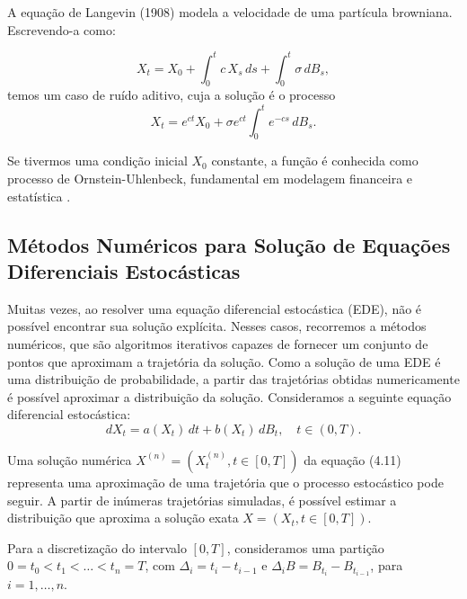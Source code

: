 \documentclass[12pt,openright,oneside,a4paper]{abntex2}
\numberwithin{equation}{section}
\begin{document}
A equação de Langevin (1908) modela a velocidade de uma partícula browniana. Escrevendo-a como:

\begin{equation}
X_t = X_0 + \int_0^t c\, X_s \, ds + \int_0^t \sigma \, dB_s,
\end{equation}
temos um caso de ruído aditivo, cuja a solução é o processo 
\begin{equation}
X_t = e^{ct} X_0 + \sigma e^{ct} \int_0^t e^{-cs}\, dB_s.
\end{equation}

Se tivermos uma condição inicial $X_0$ constante, a função é conhecida como  processo de Ornstein-Uhlenbeck, fundamental em modelagem financeira e estatística \parencite [p.~141] {Mikosh}.




\subsection{Métodos Numéricos para Solução de Equações Diferenciais Estocásticas}


Muitas vezes, ao resolver uma equação diferencial estocástica (EDE), não é possível encontrar sua solução explícita. 
Nesses casos, recorremos a métodos numéricos, que são algoritmos iterativos capazes de fornecer um conjunto de pontos 
que aproximam a trajetória da solução. Como a solução de uma EDE é uma distribuição de probabilidade, a partir das 
trajetórias obtidas numericamente é possível aproximar a distribuição da solução. Consideramos a seguinte equação diferencial estocástica:
\begin{equation}
    dX_t = a(X_t)\,dt + b(X_t)\,dB_t, \quad t \in (0,T).
\end{equation}

Uma solução numérica \(X^{(n)} = (X_t^{(n)}, t \in [0,T])\) da equação (4.11) representa uma aproximação de uma trajetória que o processo estocástico pode seguir. A partir de inúmeras trajetórias simuladas, é possível estimar a distribuição que aproxima a solução exata \(X = (X_t, t \in [0,T])\).

Para a discretização do intervalo \([0,T]\), consideramos uma partição \(0 = t_0 < t_1 < \dots < t_n = T\), com \(\Delta_i = t_i - t_{i-1}\) e \(\Delta_i B = B_{t_i} - B_{t_{i-1}}\), para \(i = 1, \dots, n\).
\end{document}
